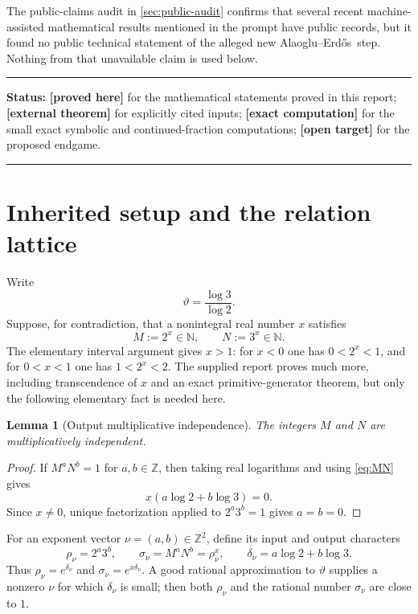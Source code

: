 \documentclass[11pt,oneside]{article}
\newtheorem{lemma}[theorem]{Lemma}
\theoremstyle{definition}
\theoremstyle{remark}
\newcommand{\N}{\mathbb N}
\newcommand{\Z}{\mathbb Z}
\newcommand{\AEname}{Alaoglu--Erd\H{o}s}
\newcommand{\thetaAE}{\vartheta}
\newcommand{\statusproved}{\textcolor{provedgreen}{\textbf{[proved here]}}}
\newcommand{\statusexternal}{\textcolor{externalblue}{\textbf{[external theorem]}}}
\newcommand{\statustarget}{\textcolor{targetviolet}{\textbf{[open target]}}}
\newcommand{\statuscomp}{\textcolor{targetviolet}{\textbf{[exact computation]}}}
\newenvironment{statusbox}[1]
{\begin{center}\begin{minipage}{0.94\textwidth}\raggedright\hrule\vspace{0.45em}
\textbf{Status:} #1\par\vspace{0.35em}}
{\vspace{0.35em}\hrule\end{minipage}\end{center}}
\begin{document}
The public-claims audit in \cref{sec:public-audit} confirms that several recent machine-assisted
mathematical results mentioned in the prompt have public records, but it found no public
technical statement of the alleged new \AEname\ step.  Nothing from that unavailable claim is
used below.

\begin{statusbox}{\statusproved{} for the mathematical statements proved in this report;
\statusexternal{} for explicitly cited inputs; \statuscomp{} for the small exact symbolic and
continued-fraction computations; \statustarget{} for the proposed endgame.}
\end{statusbox}

\section{Inherited setup and the relation lattice}
\label{sec:setup}

Write
\[
  \thetaAE=\frac{\log 3}{\log 2}.
\]
Suppose, for contradiction, that a nonintegral real number $x$ satisfies
\begin{equation}
  M:=2^x\in\N,
  \qquad
  N:=3^x\in\N.
  \label{eq:MN}
\end{equation}
The elementary interval argument gives $x>1$: for $x<0$ one has $0<2^x<1$, and for
$0<x<1$ one has $1<2^x<2$.  The supplied report proves much more, including transcendence of
$x$ and an exact primitive-generator theorem, but only the following elementary fact is
needed here.

\begin{lemma}[Output multiplicative independence]
\label{lem:MN-independent}
The integers $M$ and $N$ are multiplicatively independent.
\end{lemma}

\begin{proof}
If $M^aN^b=1$ for $a,b\in\Z$, then taking real logarithms and using
\eqref{eq:MN} gives
\[
  x(a\log2+b\log3)=0.
\]
Since $x\ne0$, unique factorization applied to $2^a3^b=1$ gives $a=b=0$.
\end{proof}

For an exponent vector $\nu=(a,b)\in\Z^2$, define its input and output characters
\begin{equation}
 \rho_\nu=2^a3^b,
 \qquad
 \sigma_\nu=M^aN^b=\rho_\nu^x,
 \qquad
 \delta_\nu=a\log2+b\log3.
 \label{eq:characters}
\end{equation}
Thus $\rho_\nu=e^{\delta_\nu}$ and $\sigma_\nu=e^{x\delta_\nu}$.  A good rational
approximation to $\thetaAE$ supplies a nonzero $\nu$ for which $\delta_\nu$ is small; then
both $\rho_\nu$ and the rational number $\sigma_\nu$ are close to $1$.
\end{document}
